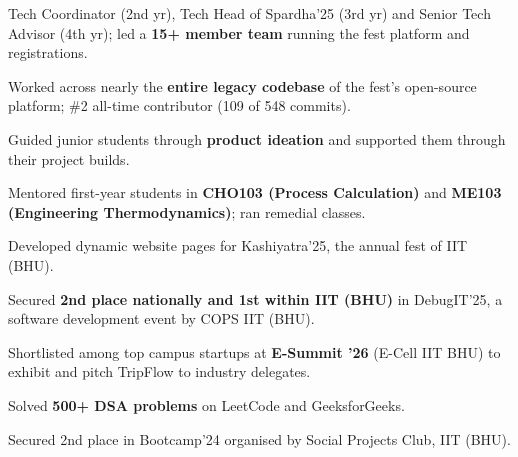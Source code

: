 \documentclass[10pt]{article}
\begin{document}
\begin{rkbody}
\begin{rkitems}
  \item Tech Coordinator (2nd yr), Tech Head of Spardha'25 (3rd yr) and Senior Tech Advisor (4th yr); led a \textbf{15+ member team} running the fest platform and registrations.
  \item Worked across nearly the \textbf{entire legacy codebase} of the fest's open-source platform; \#2 all-time contributor (109 of 548 commits).
\end{rkitems}
\begin{rkitems}
  \item Guided junior students through \textbf{product ideation} and supported them through their project builds.
\end{rkitems}
\begin{rkitems}
  \item Mentored first-year students in \textbf{CHO103 (Process Calculation)} and \textbf{ME103 (Engineering Thermodynamics)}; ran remedial classes.
\end{rkitems}
\begin{rkitems}
  \item Developed dynamic website pages for Kashiyatra'25, the annual fest of IIT (BHU).
\end{rkitems}

\begin{rkitems}
  \item Secured \textbf{2nd place nationally and 1st within IIT (BHU)} in DebugIT'25, a software development event by COPS IIT (BHU).
  \item Shortlisted among top campus startups at \textbf{E-Summit '26} (E-Cell IIT BHU) to exhibit and pitch TripFlow to industry delegates.
  \item Solved \textbf{500+ DSA problems} on LeetCode and GeeksforGeeks.
  \item Secured 2nd place in Bootcamp'24 organised by Social Projects Club, IIT (BHU).
\end{rkitems}

\end{rkbody}
\end{document}
